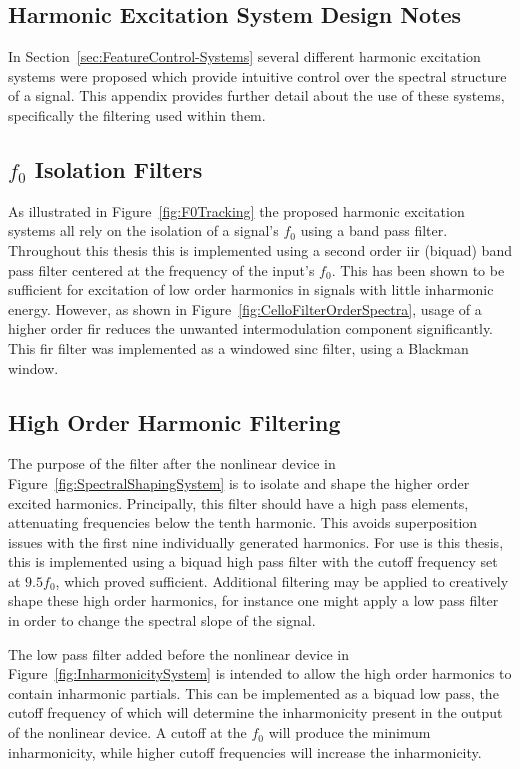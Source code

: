 \begin{appendices}
\chapter{Harmonic Excitation System Design Notes}
\label{app:FilterNotes}
	In Section~\ref{sec:FeatureControl-Systems} several different harmonic excitation systems were proposed which
	provide intuitive control over the spectral structure of a signal. This appendix provides further detail about the
	use of these systems, specifically the filtering used within them.

	\section{$f_{0}$ Isolation Filters}
		As illustrated in Figure~\ref{fig:F0Tracking} the proposed harmonic excitation systems all rely on the
		isolation of a signal's $f_{0}$ using a band pass filter. Throughout this thesis this is implemented using
		a second order \acrshort{iir} (biquad) band pass filter centered at the frequency of the input's $f_{0}$.
		This has been shown to be sufficient for excitation of low order harmonics in signals with little inharmonic
		energy.  However, as shown in Figure~\ref{fig:CelloFilterOrderSpectra}, usage of a higher order
		\acrshort{fir} reduces the unwanted intermodulation component significantly. This \acrshort{fir} filter was
		implemented as a windowed sinc filter, using a Blackman window.

	\section{High Order Harmonic Filtering}
		The purpose of the filter after the nonlinear device in Figure~\ref{fig:SpectralShapingSystem} is to isolate
		and shape the higher order excited harmonics. Principally, this filter should have a high pass elements,
		attenuating frequencies below the tenth harmonic. This avoids superposition issues with the first nine
		individually generated harmonics. For use is this thesis, this is implemented using a biquad high pass
		filter with the cutoff frequency set at $9.5f_{0}$, which proved sufficient. Additional filtering may be
		applied to creatively shape these high order harmonics, for instance one might apply a low pass filter in
		order to change the spectral slope of the signal.

		The low pass filter added before the nonlinear device in Figure~\ref{fig:InharmonicitySystem} is intended to
		allow the high order harmonics to contain inharmonic partials. This can be implemented as a biquad low pass,
		the cutoff frequency of which will determine the inharmonicity present in the output of the nonlinear
		device. A cutoff at the $f_{0}$ will produce the minimum inharmonicity, while higher cutoff frequencies will
		increase the inharmonicity.


\end{appendices}
